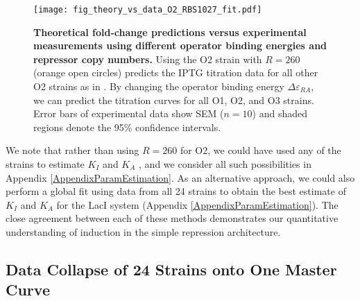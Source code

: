 \begin{figure}[h!]
	\centering \texttt{[image: fig\_theory\_vs\_data\_O2\_RBS1027\_fit.pdf]}
	\caption{{\bf Theoretical fold-change predictions versus experimental
			measurements using different operator binding energies and repressor copy
			numbers.}  Using the O2 strain with $R=260$ (orange open circles) predicts the IPTG
		titration data for all other O2 strains as in . By changing
		the operator binding energy $\Delta \varepsilon_{RA}$, we can predict the
		titration curves for all  O1,  O2, and
		 O3 strains. Error bars of experimental data show SEM ($n=10$)
		and shaded regions denote the 95\% confidence intervals. } \label{fig_result2}
\end{figure}

We note that rather than using $R=260$ for O2, we could have used any of the
strains to estimate $K_I$ and $K_A$ , and we consider all such
possibilities in Appendix \ref{AppendixParamEstimation}. As an alternative
approach, we could also perform a global fit using data from all 24 strains to
obtain the best estimate of $K_I$ and $K_A$ for the LacI system (Appendix
\ref{AppendixParamEstimation}). The close agreement between each of these
methods demonstrates our quantitative understanding of induction in the simple
repression architecture.

\subsection*{Data Collapse of 24 Strains onto One Master Curve}


